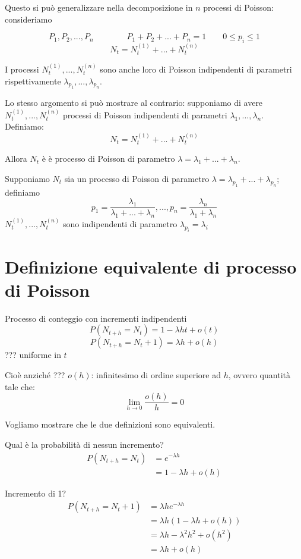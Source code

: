 \documentclass[a4paper,12pt]{book}
\begin{document}
Questo si può generalizzare nella decomposizione in $ n $ processi di Poisson: consideriamo

$$ P_1, P_2, ..., P_n \qquad \qquad P_1 + P_2 + ... + P_n  = 1 \qquad 0 \le p_i \le 1 $$
$$ N_t = N_t^{(1)} + ... + N_t^{(n)} $$

I processi $ N_t^{(1)}, ..., N_t^{(n)} $ sono anche loro di Poisson indipendenti di parametri rispettivamente $ \lambda_{p_1}, ..., \lambda_{p_n} $.

Lo stesso argomento si può mostrare al contrario: supponiamo di avere $ N_t^{(1)}, ..., N_t^{(n)} $ processi di Poisson indipendenti di parametri $ \lambda_{1}, ..., \lambda_{n} $. Definiamo:
$$ N_t = N_t^{(1)} + ... + N_t^{(n)} $$

Allora $ N_t $ è è processo di Poisson di parametro $ \lambda = \lambda_{1} + ... + \lambda_{n} $.

Supponiamo $ N_t $ sia un processo di Poisson di parametro $ \lambda = \lambda_{p_1} + ... + \lambda_{p_n} $; definiamo 
$$ p_1  = \frac{\lambda_1}{\lambda_1 + ... + \lambda_{n}}, ... , p_n = \frac{\lambda_{n}}{\lambda_{1} + \lambda_{n}}$$
$ N_t^{(1)}, ..., N_t^{(n)} $ sono indipendenti di parametro $\lambda_{p_i} = \lambda_{i}$

\section{Definizione equivalente di processo di Poisson}
Processo di conteggio con incrementi indipendenti 
$$ P(N_{t + h} = N_t) = 1 - \lambda h t + o(t) $$
$$ P(N_{t + h} = N_t + 1) = \lambda h + o(h) $$
??? uniforme in $ t $ %

Cioè anziché ??? %
$ o(h) $: infinitesimo di ordine superiore ad $ h $, ovvero quantità tale che:
$$ \lim\limits_{h \to 0} \frac{o(h)}{h} = 0 $$

Vogliamo mostrare che le due definizioni sono equivalenti. 

Qual è la probabilità di nessun incremento?
\begin{align*}
	P(N_{t+h} = N_t) & = e^{-\lambda h} \\
	& = 1 - \lambda h + o(h)
\end{align*}

Incremento di 1?
\begin{align*}	
	P(N_{t+h} = N_t + 1) & = \lambda h e^{-\lambda h } \\ 
	& = \lambda h (1 - \lambda h + o(h)) \\
	& = \lambda h - \lambda^2 h^2 + o(h^2) \\
	& = \lambda h + o(h)
\end{align*}
\end{document}
